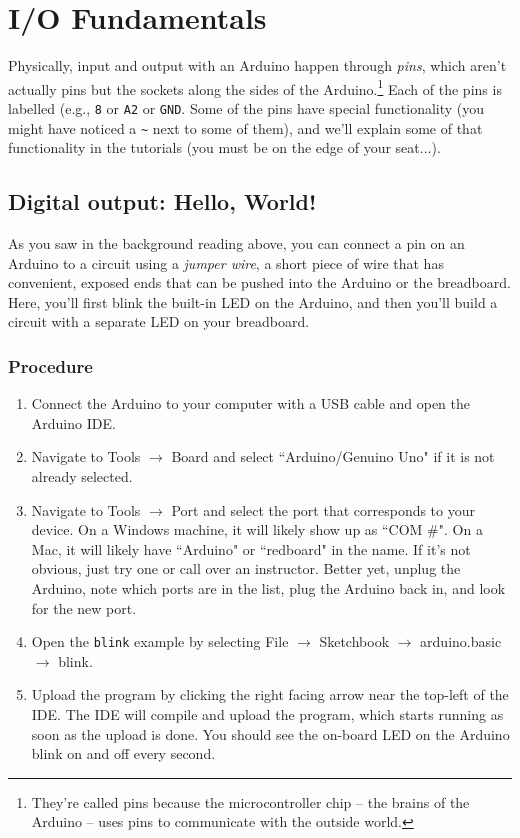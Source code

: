 \documentclass[11pt]{article} %
\begin{document}
\section*{I/O Fundamentals}

Physically, input and output with an Arduino happen through \emph{pins}, which aren’t actually pins but the sockets along the sides of the Arduino.\footnote{They’re called pins because the microcontroller chip -- the brains of the Arduino -- uses pins to communicate with the outside world.} Each of the pins is labelled (e.g., \verb|8| or \verb|A2| or \verb|GND|. Some of the pins have special functionality (you might have noticed a \verb|~| next to some of them), and we’ll explain some of that functionality in the tutorials (you must be on the edge of your seat...).

\subsection*{Digital output: Hello, World!}

As you saw in the background reading above, you can connect a pin on an Arduino to a circuit using a \emph{jumper wire}, a short piece of wire that has convenient, exposed ends that can be pushed into the Arduino or the breadboard. Here, you’ll first blink the built-in LED on the Arduino, and then you’ll build a circuit with a separate LED on your breadboard.

\subsubsection*{Procedure}

\begin{enumerate}
\item Connect the Arduino to your computer with a USB cable and open the Arduino IDE.
\item Navigate to Tools $\rightarrow$ Board and select ``Arduino/Genuino Uno" if it is not already selected.
\item Navigate to Tools $\rightarrow$ Port and select the port that corresponds to your device. On a Windows machine, it will likely show up as ``COM \#". On a Mac, it will likely have ``Arduino" or ``redboard" in the name. If it’s not obvious, just try one or call over an instructor. Better yet, unplug the Arduino, note which ports are in the list, plug the Arduino back in, and look for the new port.
\item Open the \verb|blink| example by selecting File $\rightarrow$ Sketchbook $\rightarrow$ arduino.basic $\rightarrow$ blink.
\item Upload the program by clicking the right facing arrow near the top-left of the IDE. The IDE will compile and upload the program, which starts running as soon as the upload is done. You should see the on-board LED on the Arduino blink on and off every second.
\end{enumerate}
\end{document}
